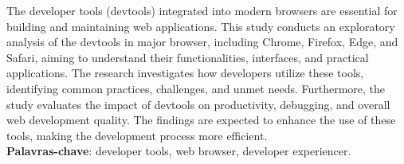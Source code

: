 
\begin{resumo}[ABSTRACT]
\begin{SingleSpacing}


The developer tools (devtools) integrated into modern browsers are essential for building and maintaining web applications. This study conducts an exploratory analysis of the devtools in major browser, including Chrome, Firefox, Edge, and Safari, aiming to understand their functionalities, interfaces, and practical applications. The research investigates how developers utilize these tools, identifying common practices, challenges, and unmet needs. Furthermore, the study evaluates the impact of devtools on productivity, debugging, and overall web development quality. The findings are expected to enhance the use of these tools, making the development process more efficient. \\

\textbf{Palavras-chave}: developer tools, web browser, developer experiencer.

\end{SingleSpacing}
\end{resumo}

